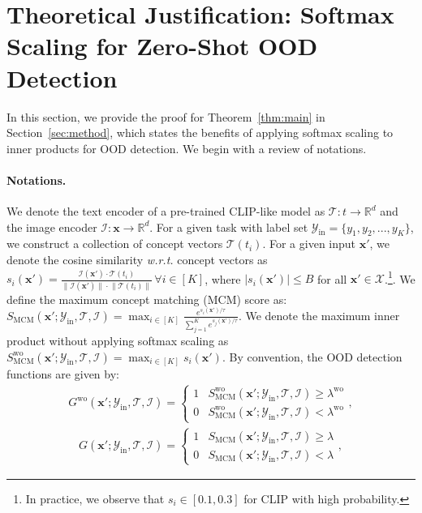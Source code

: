 \documentclass{article}
\def\*#1{\mathbf{#1}}
\begin{document}



\medskip



\newpage




\appendix
\section{Theoretical Justification: Softmax Scaling for Zero-Shot OOD Detection}
\label{sec:proof}
In this section, we provide the proof for Theorem~\ref{thm:main} in Section~\ref{sec:method}, which states the benefits of applying softmax scaling to inner products for OOD detection. We begin with a review of notations.

\paragraph{Notations.} We denote the text encoder of a pre-trained CLIP-like model as $\mathcal{T}: t \rightarrow \mathbb{R}^d$ and the image encoder $\mathcal{I}: \*x \rightarrow \mathbb{R}^d$. For a given task with label set $\mathcal{Y}_\text{in}=\{y_1, y_2,...,y_K\}$, we construct a collection of concept vectors $\mathcal{T}(t_i)$. For a given input $\*x'$, we denote the cosine similarity \emph{w.r.t.} concept vectors as $s_i(\*x') = \frac{\mathcal{I}(\*x') \cdot \mathcal{T}(t_i)}{\lVert \mathcal{I}(\*x')\rVert \cdot \lVert \mathcal{T}(t_i) \rVert} \, \forall i\in[K]$, where $|s_i(\*x')| \leq B$ for all $\*x'\in \mathcal{X}$.\footnote{In practice, we observe that $s_i\in[0.1, 0.3]$ for CLIP with high probability.}. We define the maximum concept matching (MCM) score as: $S_{\text{MCM}}(\*x';\mathcal{Y}_\text{in},\mathcal{T},\mathcal{I}) = \max_{i\in[K]} \frac{e^{s_i(\*x')/\tau}}{\sum_{j=1}^K e^{s_j(\*x')/\tau}}$. We denote the maximum inner product without applying softmax scaling as $S_{\text{MCM}}^{\text{wo}}(\*x';\mathcal{Y}_\text{in},\mathcal{T},\mathcal{I}) = \max_{i\in[K]} s_i(\*x')$. By convention, the OOD detection functions are given by:
\begin{align*}
	G^{\text{wo}}(\*x';\mathcal{Y}_\text{in},\mathcal{T},\mathcal{I}) =\begin{cases} 
      1 & S_{\text{MCM}}^{\text{wo}}(\*x';\mathcal{Y}_\text{in},\mathcal{T},\mathcal{I})\ge \lambda^{\text{wo}} \\
      0 & S_{\text{MCM}}^{\text{wo}}(\*x';\mathcal{Y}_\text{in},\mathcal{T},\mathcal{I}) < \lambda^{\text{wo}} 
  \end{cases},
\end{align*}
\begin{align*}
	G(\*x';\mathcal{Y}_\text{in},\mathcal{T},\mathcal{I}) =\begin{cases} 
      1 & S_{\text{MCM}}(\*x';\mathcal{Y}_\text{in},\mathcal{T},\mathcal{I})\ge \lambda \\
      0 & S_{\text{MCM}}(\*x';\mathcal{Y}_\text{in},\mathcal{T},\mathcal{I}) < \lambda 
  \end{cases},
\end{align*}
\end{document}
